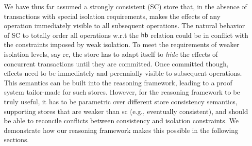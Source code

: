 We have thus far assumed a strongly consistent ({\sc SC}) store that,
in the absence of transactions with special isolation requirements,
makes the effects of any operation immediately visible to all
subsequent operations. The natural behavior of {\sc SC} to totally
order all operations w.r.t the $\textsf{hb}$ relation could be in conflict
with the constraints imposed by weak isolation. To meet the
requirements of weaker isolation levels, say {\sc rc}, the store has
to adapt itself to \emph{hide} the effects of concurrent transactions
until they are committed. Once committed though, effects need to be
immediately and perennially visible to subsequent operations. This
semantics can be built into the reasoning framework, leading to a proof
system tailor-made for such stores. However, for the reasoning
framework to be truly useful, it has to be parametric over different
store consistency semantics, supporting stores that are weaker than
{\sc sc} (e.g., eventually consistent), and should be able to
reconcile conflicts between consistency and isolation
constraints.  We demonstrate how our reasoning framework
makes this possible in the following sections.
